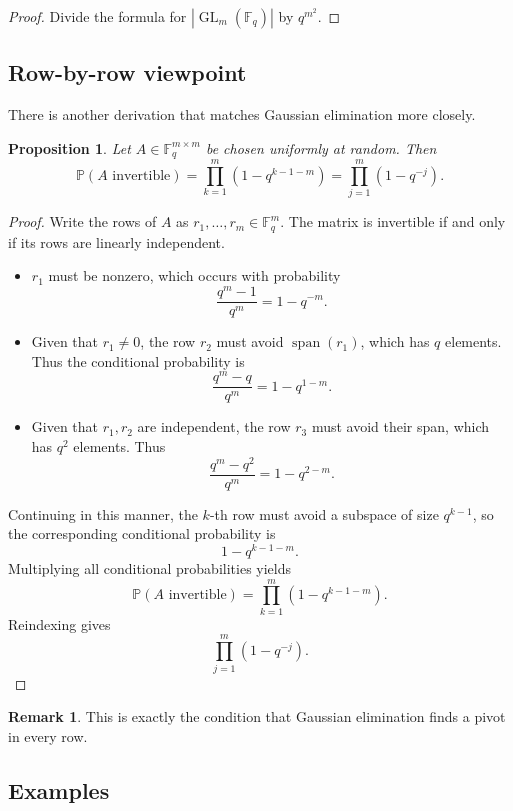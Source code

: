 \documentclass[11pt]{article}
\newcommand{\F}{\mathbb{F}}
\newcommand{\GL}{\operatorname{GL}}
\newcommand{\Span}{\operatorname{span}}
\newcommand{\Prob}{\mathbb{P}}
\theoremstyle{definition}
\newtheorem{remark}[definition]{Remark}
\theoremstyle{plain}
\newtheorem{proposition}[definition]{Proposition}
\begin{document}
	\begin{proof}
		Divide the formula for \(|\GL_m(\F_q)|\) by \(q^{m^2}\).
	\end{proof}
	
	\subsection{Row-by-row viewpoint}
	
	There is another derivation that matches Gaussian elimination more closely.
	
	\begin{proposition}
		Let \(A\in \F_q^{m\times m}\) be chosen uniformly at random. Then
		\[
		\Prob(A \text{ invertible}) = \prod_{k=1}^{m}\left(1-q^{k-1-m}\right)
		= \prod_{j=1}^{m}(1-q^{-j}).
		\]
	\end{proposition}
	
	\begin{proof}
		Write the rows of \(A\) as \(r_1,\dots,r_m\in \F_q^m\). The matrix is invertible if and only if its rows are linearly independent.
		
		\begin{itemize}[leftmargin=2em]
			\item \(r_1\) must be nonzero, which occurs with probability
			\[
			\frac{q^m-1}{q^m}=1-q^{-m}.
			\]
			\item Given that \(r_1\neq 0\), the row \(r_2\) must avoid \(\Span(r_1)\), which has \(q\) elements. Thus the conditional probability is
			\[
			\frac{q^m-q}{q^m}=1-q^{1-m}.
			\]
			\item Given that \(r_1,r_2\) are independent, the row \(r_3\) must avoid their span, which has \(q^2\) elements. Thus
			\[
			\frac{q^m-q^2}{q^m}=1-q^{2-m}.
			\]
		\end{itemize}
		
		Continuing in this manner, the \(k\)-th row must avoid a subspace of size \(q^{k-1}\), so the corresponding conditional probability is
		\[
		1-q^{k-1-m}.
		\]
		Multiplying all conditional probabilities yields
		\[
		\Prob(A \text{ invertible}) = \prod_{k=1}^{m}(1-q^{k-1-m}).
		\]
		Reindexing gives
		\[
		\prod_{j=1}^{m}(1-q^{-j}).
		\]
	\end{proof}
	
	\begin{remark}
		This is exactly the condition that Gaussian elimination finds a pivot in every row.
	\end{remark}
	
	\subsection{Examples}
	
\end{document}
